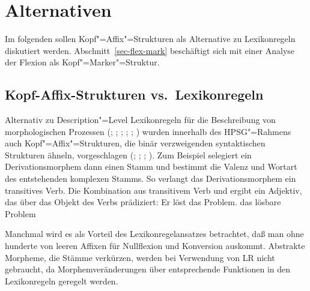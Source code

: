 \section{Alternativen}

Im folgenden sollen Kopf"=Affix"=Strukturen als Alternative zu Lexikonregeln diskutiert werden.
Abschnitt~\ref{sec-flex-mark} beschäftigt sich mit einer Analyse der Flexion als Kopf"=Marker"=Struktur.

\subsection{Kopf-Affix-Strukturen vs.\ Lexikonregeln}
\label{morphem-vs-lr}

Alternativ zu Description"=Level Lexikonregeln für die Beschreibung von morphologischen Prozessen
(\citealp{Orgun96a}; \citealp{Riehemann98a}; \citealp{AW98a}; \citealp{Koenig99a};
\citealp[Kapitel~6.2.5]{Mueller2002b}; \citealp{Crysmann2002a}) wurden innerhalb des HPSG"=Rahmens
auch Kopf"=Affix"=Strukturen, die binär verzweigenden syntaktischen Strukturen ähneln, vorgeschlagen 
(\citealp{KN93a}; \citealp{Krieger94a}; \citealp{Eynde94}; \citealp{Lebeth94}).
Zum Beispiel selegiert ein Derivationsmorphem dann einen Stamm und bestimmt die Valenz und Wortart
des entstehenden komplexen Stamms. So verlangt das Derivationsmorphem  ein transitives
Verb. Die Kombination aus transitivem Verb und  ergibt ein Adjektiv, das über
das Objekt des Verbs prädiziert:
\eal
\ex Er löst das Problem.
\ex das lösbare Problem
\zl


\noindent
Manchmal wird es als Vorteil des Lexikonregelansatzes betrachtet, daß man ohne hunderte von leeren
Affixen für Nullflexion und Konversion auskommt. Abstrakte Morpheme, die Stämme verkürzen, werden bei Verwendung
von LR nicht gebraucht, da Morphemveränderungen über entsprechende Funktionen in den Lexikonregeln
geregelt werden. 

